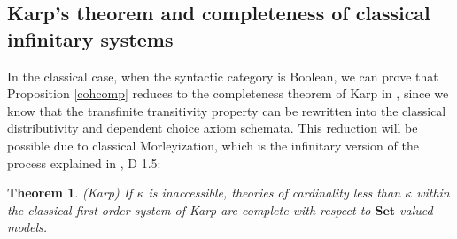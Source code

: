 \documentclass[a4paper,11pt]{article}
\theoremstyle{plain}
\newtheorem{thm}{Theorem}[subsection]
\theoremstyle{plain}
\theoremstyle{remark}
\newcommand{\Sets}{\ensuremath{\mathbf{Set}}}
\begin{document}
\subsection{Karp's theorem and completeness of classical infinitary systems}

In the classical case, when the syntactic category is Boolean, we can prove that Proposition \ref{cohcomp} reduces to the completeness theorem of Karp in \cite{karp}, since we know that the transfinite transitivity property can be rewritten into the classical distributivity and dependent choice axiom schemata. This reduction will be possible due to classical Morleyization, which is the infinitary version of the process explained in \cite{johnstone}, D 1.5:

\begin{thm}\label{karp}
 (Karp) If $\kappa$ is inaccessible, theories of cardinality less than $\kappa$ within the classical first-order system of Karp are complete with respect to \Sets-valued models.
\end{thm}
\end{document}
